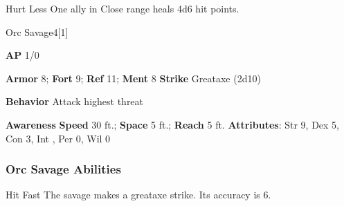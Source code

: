 \vspace{0.5em}
\begin{freeability}{Hurt Less}
One ally in Close range heals 4d6 hit points.
\end{freeability}

\begin{monsection}{Orc Savage}{4}[1]
\vspace{-1em}\vspace{-1em}
\begin{spellcontent}
\begin{spelltargetinginfo}
{\textbf{AP} 1/0}

\pari \textbf{Armor} 8;
\textbf{Fort} 9;
\textbf{Ref} 11;
\textbf{Ment} 8
\pari \textbf{Strike} Greataxe  (2d10)



\pari \textbf{Behavior} Attack highest threat
\end{spelltargetinginfo}
\end{spellcontent}

\begin{monsterfooter}
\pari \textbf{Awareness} 
\pari \textbf{Speed} 30 ft.;
\textbf{Space} 5 ft.;
\textbf{Reach} 5 ft.
\pari \textbf{Attributes}:
Str 9,
Dex 5,
Con 3,
Int ,
Per 0,
Wil 0
\end{monsterfooter}
\end{monsection}


\subsubsection{Orc Savage Abilities}

\begin{freeability}{Hit Fast}
The savage makes a greataxe strike.
Its accuracy is 6.
\end{freeability}

